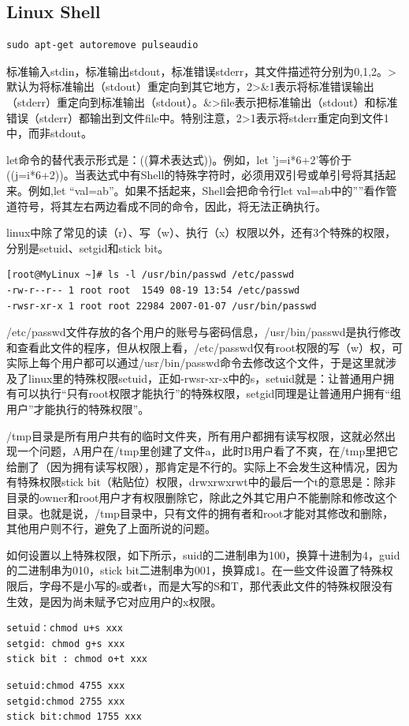 \subsection{Linux Shell}
\begin{verbatim}
sudo apt-get autoremove pulseaudio
\end{verbatim}
\par 标准输入stdin，标准输出stdout，标准错误stderr，其文件描述符分别为0,1,2。>默认为将标准输出（stdout）重定向到其它地方，2>\&1表示将标准错误输出（stderr）重定向到标准输出（stdout）。\&>file表示把标准输出（stdout）和标准错误（stderr）都输出到文件file中。特别注意，2>1表示将stderr重定向到文件1中，而非stdout。
\par let命令的替代表示形式是：((算术表达式))。例如，let 'j=i*6+2'等价于((j=i*6+2))。当表达式中有Shell的特殊字符时，必须用双引号或单引号将其括起来。例如,let ``val=a\textbar b''。如果不括起来，Shell会把命令行let val=a\textbar b中的''\textbar''看作管道符号，将其左右两边看成不同的命令，因此，将无法正确执行。 
\par linux中除了常见的读（r）、写（w）、执行（x）权限以外，还有3个特殊的权限，分别是setuid、setgid和stick bit。
\begin{verbatim}
[root@MyLinux ~]# ls -l /usr/bin/passwd /etc/passwd
-rw-r--r-- 1 root root  1549 08-19 13:54 /etc/passwd
-rwsr-xr-x 1 root root 22984 2007-01-07 /usr/bin/passwd
\end{verbatim}
\par /etc/passwd文件存放的各个用户的账号与密码信息，/usr/bin/passwd是执行修改和查看此文件的程序，但从权限上看，/etc/passwd仅有root权限的写（w）权，可实际上每个用户都可以通过/usr/bin/passwd命令去修改这个文件，于是这里就涉及了linux里的特殊权限setuid，正如-rwsr-xr-x中的s，setuid就是：让普通用户拥有可以执行“只有root权限才能执行”的特殊权限，setgid同理是让普通用户拥有“组用户”才能执行的特殊权限”。
\par /tmp目录是所有用户共有的临时文件夹，所有用户都拥有读写权限，这就必然出现一个问题，A用户在/tmp里创建了文件a，此时B用户看了不爽，在/tmp里把它给删了（因为拥有读写权限），那肯定是不行的。实际上不会发生这种情况，因为有特殊权限stick bit（粘贴位）权限，drwxrwxrwt中的最后一个t的意思是：除非目录的owner和root用户才有权限删除它，除此之外其它用户不能删除和修改这个目录。也就是说，/tmp目录中，只有文件的拥有者和root才能对其修改和删除，其他用户则不行，避免了上面所说的问题。
\par 如何设置以上特殊权限，如下所示，suid的二进制串为100，换算十进制为4，guid的二进制串为010，stick bit二进制串为001，换算成1。在一些文件设置了特殊权限后，字母不是小写的s或者t，而是大写的S和T，那代表此文件的特殊权限没有生效，是因为尚未赋予它对应用户的x权限。\\
\begin{minipage}{.5\linewidth}
\begin{verbatim}
setuid：chmod u+s xxx
setgid: chmod g+s xxx
stick bit : chmod o+t xxx
\end{verbatim}  
\end{minipage}
\begin{minipage}{.5\linewidth}
\begin{verbatim}
setuid:chmod 4755 xxx
setgid:chmod 2755 xxx
stick bit:chmod 1755 xxx
\end{verbatim}  
\end{minipage}
